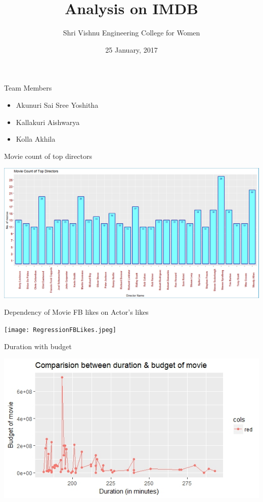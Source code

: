 \documentclass[14pt]{beamer}
\title[IMDB]{Analysis on IMDB}
\author[SVECW]{Shri Vishnu Engineering College for Women}
\institute{Bhimavaram}
\date{25 January, 2017}
\begin{document}
\begin{frame}
  \titlepage

 \end{frame}
\begin{frame}{Team Members}
\begin{itemize}
\item Akunuri Sai Sree Yoshitha
\item Kallakuri Aishwarya
\item Kolla Akhila
\end{itemize}
\end{frame} 




\begin{frame}{Movie count of top directors}
  \begin{center}
    \includegraphics[scale=0.34]{DirFreq.png}
  \end{center}
\end{frame}


\begin{frame}{Dependency of Movie FB likes on Actor's likes}
  \begin{center}
    \texttt{[image: RegressionFBLikes.jpeg]}
  \end{center}
\end{frame}

\begin{frame}{Duration with budget}
  \begin{center}
    \includegraphics[scale=0.70]{DurationBudget.jpeg}
  \end{center}
\end{frame}
\end{document}
